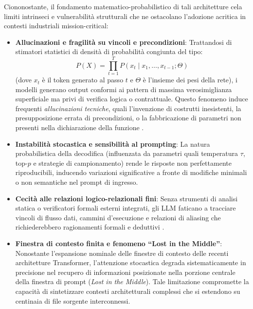Ciononostante, il fondamento matematico-probabilistico di tali architetture cela limiti intrinseci e vulnerabilità strutturali che ne ostacolano l'adozione acritica in contesti industriali mission-critical:
\begin{itemize}[leftmargin=*, label=\textbullet]
    \item \textbf{Allucinazioni e fragilità su vincoli e precondizioni}: Trattandosi di stimatori statistici di densità di probabilità congiunta del tipo:
    \begin{equation}
        P(X) = \prod_{t=1}^{T} P(x_t \mid x_1, \dots, x_{t-1}; \Theta)
        \label{eq:autoregressive_llm}
    \end{equation}
    (dove $x_t$ è il token generato al passo $t$ e $\Theta$ è l'insieme dei pesi della rete), i modelli generano output conformi ai pattern di massima verosimiglianza superficiale ma privi di verifica logica o contrattuale. Questo fenomeno induce frequenti \emph{allucinazioni tecniche}, quali l'invenzione di costrutti inesistenti, la presupposizione errata di precondizioni, o la fabbricazione di parametri non presenti nella dichiarazione della funzione \cite{yang_docagent_2025,pomian_together_2024}.
    \item \textbf{Instabilità stocastica e sensibilità al prompting}: La natura probabilistica della decodifica (influenzata da parametri quali temperatura $\tau$, top-$p$ e strategie di campionamento) rende le risposte non perfettamente riproducibili, inducendo variazioni significative a fronte di modifiche minimali o non semantiche nel prompt di ingresso.
    \item \textbf{Cecità alle relazioni logico-relazionali fini}: Senza strumenti di analisi statica o verificatori formali esterni integrati, gli LLM faticano a tracciare vincoli di flusso dati, cammini d'esecuzione e relazioni di aliasing che richiederebbero ragionamenti formali e deduttivi \cite{lomshakov_proconsul_2024}.
    \item \textbf{Finestra di contesto finita e fenomeno ``Lost in the Middle''}: Nonostante l'espansione nominale delle finestre di contesto delle recenti architetture Transformer, l'attenzione stocastica degrada sistematicamente in precisione nel recupero di informazioni posizionate nella porzione centrale della finestra di prompt (\emph{Lost in the Middle}). Tale limitazione compromette la capacità di sintetizzare contesti architetturali complessi che si estendono su centinaia di file sorgente interconnessi.
\end{itemize}


